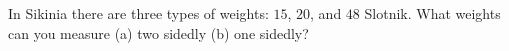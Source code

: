 In Sikinia there are three types of weights: $15$, $20$, and $48$ Slotnik. What weights can you measure (a) two sidedly (b) one sidedly?
